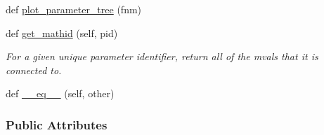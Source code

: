 \begin{DoxyCompactItemize}
def \hyperlink{classsrc_1_1forcefield_1_1FF_a362121bdb7852ba8bb1b9a6a1ba3a32f}{plot\+\_\+parameter\+\_\+tree} (fnm)
\item 
def \hyperlink{classsrc_1_1forcefield_1_1FF_a23ac17f14551fb1c32bd72b37ba38a48}{get\+\_\+mathid} (self, pid)
\begin{DoxyCompactList}\small\item\em For a given unique parameter identifier, return all of the mvals that it is connected to. \end{DoxyCompactList}\item 
def \hyperlink{classsrc_1_1forcefield_1_1FF_a129c4530b397fc7f449363613743d68f}{\+\_\+\+\_\+eq\+\_\+\+\_\+} (self, other)
\end{DoxyCompactItemize}
\subsubsection*{Public Attributes}
